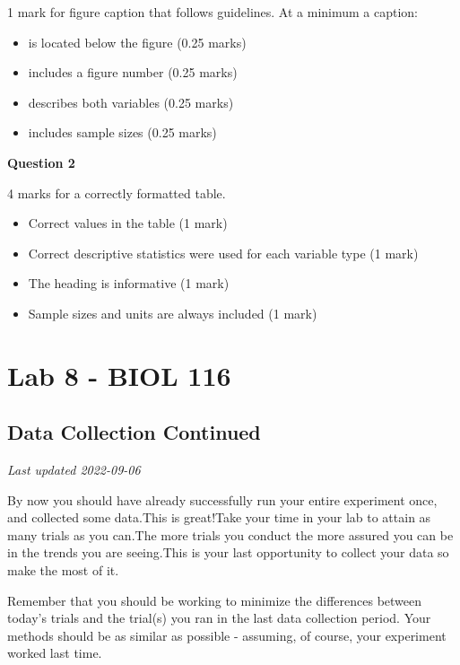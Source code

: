 \documentclass[
]{book}
\providecommand{\tightlist}{%
  \setlength{\itemsep}{0pt}\setlength{\parskip}{0pt}}
\begin{document}
1 mark for figure caption that follows guidelines. At a minimum a caption:

\begin{itemize}
\tightlist
\item
  is located below the figure (0.25 marks)
\item
  includes a figure number (0.25 marks)
\item
  describes both variables (0.25 marks)
\item
  includes sample sizes (0.25 marks)
\end{itemize}

\textbf{Question 2}

4 marks for a correctly formatted table.

\begin{itemize}
\tightlist
\item
  Correct values in the table (1 mark)
\item
  Correct descriptive statistics were used for each variable type (1 mark)
\item
  The heading is informative (1 mark)
\item
  Sample sizes and units are always included (1 mark)
\end{itemize}

\hypertarget{part-lab-8---biol-116}{%
\part*{Lab 8 - BIOL 116}\label{part-lab-8---biol-116}}

\hypertarget{data-collection-continued}{%
\chapter*{Data Collection Continued}\label{data-collection-continued}}

\emph{Last updated 2022-09-06}

By now you should have already successfully run your entire experiment once, and collected some data.This is great!Take your time in your lab to attain as many trials as you can.The more trials you conduct the more assured you can be in the trends you are seeing.This is your last opportunity to collect your data so make the most of it.

Remember that you should be working to minimize the differences between today's trials and the trial(s) you ran in the last data collection period. Your methods should be as similar as possible - assuming, of course, your experiment worked last time.
\end{document}
